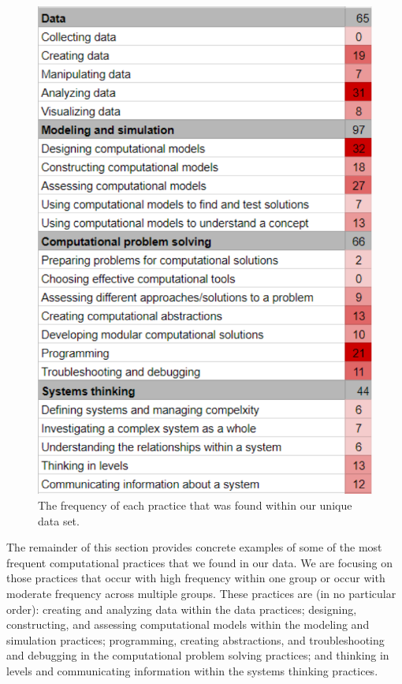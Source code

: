\documentclass{msuphddissertation}
\begin{document}
\begin{doublespace}
\begin{figure}\centering
\includegraphics[scale=0.65]{./images/CH5DensityPlot.pdf}
\caption{The frequency of each practice that was found within our unique data set.}\label{CH5:DensityPlot}
\end{figure}

The remainder of this section provides concrete examples of some of the most frequent computational practices that we found in our data.  We are focusing on those practices that occur with high frequency within one group or occur with moderate frequency across multiple groups.  These practices are (in no particular order): creating and analyzing data within the data practices; designing, constructing, and assessing computational models within the modeling and simulation practices; programming, creating abstractions, and troubleshooting and debugging in the computational problem solving practices; and thinking in levels and communicating information within the systems thinking practices.


\end{doublespace}
\end{document}
